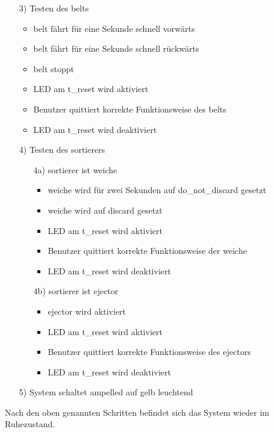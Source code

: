 \begin{enumerate}
    \item[3)] Testen des \gls{belt}s
    \begin{itemize}
        \item \Gls{belt} fährt für eine Sekunde schnell vorwärts
        \item \Gls{belt} fährt für eine Sekunde schnell rückwärts
        \item \Gls{belt} stoppt
        \item LED am \gls{t_reset} wird aktiviert
        \item Benutzer quittiert korrekte Funktionsweise des \gls{belt}s
        \item LED am \gls{t_reset} wird deaktiviert
    \end{itemize}
    \item[4)] Testen des \gls{sortierer}s
    \begin{enumerate}
        \item[4a)] \Gls{sortierer} ist \gls{weiche}
        \begin{itemize}
            \item \gls{weiche} wird für zwei Sekunden auf \gls{do_not_discard} gesetzt
            \item \gls{weiche} wird auf \gls{discard} gesetzt
            \item LED am \gls{t_reset} wird aktiviert
            \item Benutzer quittiert korrekte Funktionsweise der \gls{weiche}
            \item LED am \gls{t_reset} wird deaktiviert
        \end{itemize}
        \item[4b)] \gls{sortierer} ist \gls{ejector}
        \begin{itemize}
            \item \Gls{ejector} wird aktiviert
            \item LED am \gls{t_reset} wird aktiviert
            \item Benutzer quittiert korrekte Funktionsweise des \gls{ejector}s
            \item LED am \gls{t_reset} wird deaktiviert
        \end{itemize}
    \end{enumerate}
    \item[5)] System schaltet \gls{ampelled} auf gelb leuchtend
\end{enumerate}
Nach den oben genannten Schritten befindet sich das System wieder im Ruhezustand.


